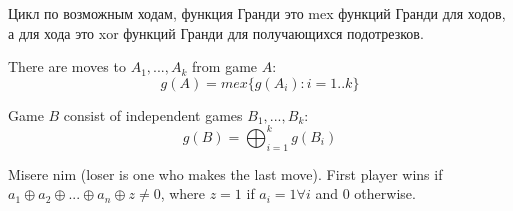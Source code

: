Цикл по возможным ходам, функция Гранди это mex функций Гранди для ходов, а для хода это xor функций Гранди для получающихся подотрезков.
\par There are moves to $A_1, ..., A_k$ from game $A$:
$$g(A) = mex\{g(A_i) : i=1..k\}$$
\par Game $B$ consist of independent games $B_1, ..., B_k$:
$$g(B) = \bigoplus_{i=1}^k g(B_i)$$
\par Misere nim (loser is one who makes the last move). First player wins if $a_1 \oplus a_2 \oplus ... \oplus a_n \oplus z \neq 0$, where $z=1$ if $a_i=1 \forall i$ and $0$ otherwise.